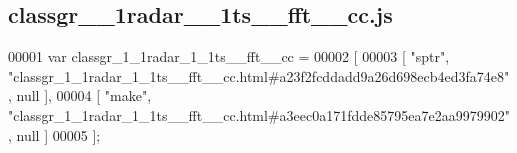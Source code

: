 \subsection{classgr\+\_\+\_\+1radar\+\_\+\_\+1ts\+\_\+\+\_\+fft\+\_\+\+\_\+cc.\+js}
\label{classgr__1__1radar__1__1ts____fft____cc_8js_source}

\begin{DoxyCode}
00001 var classgr_1_1radar_1_1ts__fft__cc =
00002 [
00003     [ \textcolor{stringliteral}{"sptr"}, \textcolor{stringliteral}{"classgr\_1\_1radar\_1\_1ts\_\_fft\_\_cc.html#a23f2fcddadd9a26d698ecb4ed3fa74e8"}, null ],
00004     [ \textcolor{stringliteral}{"make"}, \textcolor{stringliteral}{"classgr\_1\_1radar\_1\_1ts\_\_fft\_\_cc.html#a3eec0a171fdde85795ea7e2aa9979902"}, null ]
00005 ];
\end{DoxyCode}
